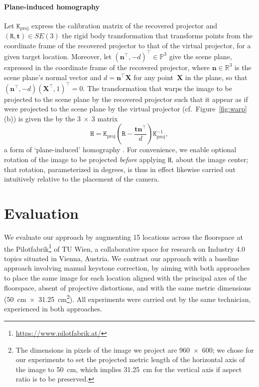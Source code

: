 \documentclass[review]{elsarticle}
\begin{document}
{\paragraph{Plane-induced homography} Let $\mathtt{K}_\text{proj}$ express the calibration matrix of the recovered projector and $(\mathtt{R}, \mathbf{t}) \in SE(3)$ the rigid body transformation that transforms points from the coordinate frame of the recovered projector to that of the virtual projector, for a given target location. Moreover, let $(\mathbf{n}^\top, -d)^\top \in \mathbb{P}^3$ give the scene plane, expressed in the coordinate frame of the recovered projector, where $\mathbf{n} \in \mathbb{R}^3$ is the scene plane's normal vector and $d = \mathbf{n}^\top\mathbf{X}$ for any point~$\mathbf{X}$ in the plane, so that $(\mathbf{n}^\top, -d) (\mathbf{X}^\top, 1)^\top = 0$. The transformation that warps the image to be projected to the scene plane by the recovered projector such that it appear as if were projected to the scene plane by the virtual projector (cf.\ Figure~\ref{fig:warp}(b)) is given the by the $3~\times~3$ matrix
\begin{equation}
\mathtt{H} = \mathtt{K}_\text{proj}\left(\mathtt{R} - \frac{\mathbf{t}\mathbf{n}^\top}{d}\right)\mathtt{K}_\text{proj}^{-1},
\label{homgen}
\end{equation}
a form of `plane-induced' homography \cite{Hartley2004}. For convenience, we enable optional rotation of the image to be projected \textit{before} applying $\mathtt{H}$, about the image center; that rotation, parameterized in degrees, is thus in effect likewise carried out intuitively relative to the placement of the camera.

\section{Evaluation}

We evaluate our approach by augmenting 15 locations across the floorspace at the Pilotfabrik\footnote{\url{https://www.pilotfabrik.at/}} of TU Wien, a collaborative space for research on Industry 4.0 topics situated in Vienna, Austria. We contrast our approach with a baseline approach involving manual keystone correction, by aiming with both approaches to place the same image for each location aligned with the principal axes of the floorspace, absent of projective distortions, and with the same metric dimensions (50~cm~$\times$~31.25~cm\footnote{The dimensions in pixels of the image we project are 960~$\times$~600; we chose for our experiments to set the projected metric length of the horizontal axis of the image to 50~cm, which implies 31.25~cm for the vertical axis if aspect ratio is to be preserved.}). All experiments were carried out by the same technician, experienced in both approaches.

}
\end{document}
